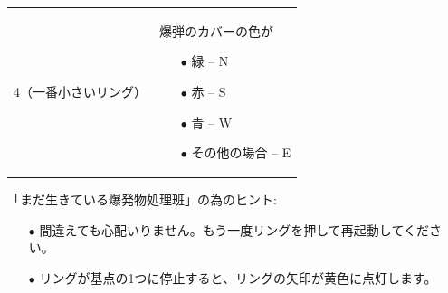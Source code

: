 \begin{tabular}{|c|l|}
{} \\ \hline
4（一番小さいリング） &
\parbox{0.7\textwidth}{
    \vspace*{0.5em}
    爆弾のカバーの色が
    \vspace*{0.5em}
    \begin{itemize}
        \item[$\bullet$] 緑 -- N
        \item[$\bullet$] 赤 -- S
        \item[$\bullet$] 青 -- W
        \item[$\bullet$] その他の場合 -- E
    \end{itemize}
    \vspace*{1em}
} \\ \hline
\end{tabular}
\egroup

「まだ生きている爆発物処理班」の為のヒント:
\begin{itemize}
    \item[$\bullet$] 間違えても心配いりません。もう一度リングを押して再起動してください。
    \item[$\bullet$] リングが基点の1つに停止すると、リングの矢印が黄色に点灯します。
\end{itemize}
